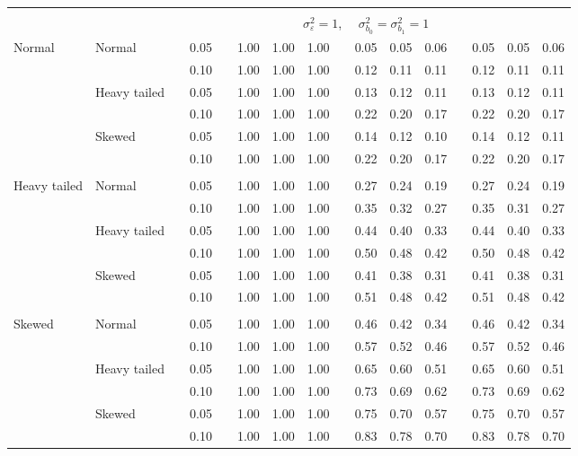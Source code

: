 \begin{table}[ht]
\begin{scriptsize}
\begin{tabular}{ll p{.1cm} c p{.1cm} rrr p{.1cm} rrr p{.1cm} rrr}
&&&&&&&&&&&&&&&\\
& && && \multicolumn{9}{c}{$\sigma_{\varepsilon}^2 = 1$, \ \ $\sigma_{b_0}^2 = \sigma_{b_1}^2 = 1$} \\ \cline{6-16}

\rowcolor{gray!20} Normal       & Normal       && 0.05 &&  1.00 & 1.00 & 1.00 && 0.05 & 0.05 & 0.06 && 0.05 & 0.05 & 0.06 \\ 
\rowcolor{gray!20}             &              && 0.10 &&  1.00 & 1.00 & 1.00 && 0.12 & 0.11 & 0.11 && 0.12 & 0.11 & 0.11 \\ 
\rowcolor{gray!20}             & Heavy tailed && 0.05 &&  1.00 & 1.00 & 1.00 && 0.13 & 0.12 & 0.11 && 0.13 & 0.12 & 0.11 \\ 
\rowcolor{gray!20}             &              && 0.10 &&  1.00 & 1.00 & 1.00 && 0.22 & 0.20 & 0.17 && 0.22 & 0.20 & 0.17 \\ 
\rowcolor{gray!20}             & Skewed       && 0.05 &&  1.00 & 1.00 & 1.00 && 0.14 & 0.12 & 0.10 && 0.14 & 0.12 & 0.11 \\ 
\rowcolor{gray!20}             &              && 0.10 &&  1.00 & 1.00 & 1.00 && 0.22 & 0.20 & 0.17 && 0.22 & 0.20 & 0.17 \\
             &&&&&&&&&&&&&&&\\ 
Heavy tailed & Normal       && 0.05 &&  1.00 & 1.00 & 1.00 && 0.27 & 0.24 & 0.19 && 0.27 & 0.24 & 0.19 \\ 
             &              && 0.10 &&  1.00 & 1.00 & 1.00 && 0.35 & 0.32 & 0.27 && 0.35 & 0.31 & 0.27 \\ 
             & Heavy tailed && 0.05 &&  1.00 & 1.00 & 1.00 && 0.44 & 0.40 & 0.33 && 0.44 & 0.40 & 0.33 \\ 
             &              && 0.10 &&  1.00 & 1.00 & 1.00 && 0.50 & 0.48 & 0.42 && 0.50 & 0.48 & 0.42 \\ 
             & Skewed       && 0.05 &&  1.00 & 1.00 & 1.00 && 0.41 & 0.38 & 0.31 && 0.41 & 0.38 & 0.31 \\ 
             &              && 0.10 &&  1.00 & 1.00 & 1.00 && 0.51 & 0.48 & 0.42 && 0.51 & 0.48 & 0.42 \\ 
             &&&&&&&&&&&&&&&\\
Skewed       & Normal       && 0.05 &&  1.00 & 1.00 & 1.00 && 0.46 & 0.42 & 0.34 && 0.46 & 0.42 & 0.34 \\ 
             &              && 0.10 &&  1.00 & 1.00 & 1.00 && 0.57 & 0.52 & 0.46 && 0.57 & 0.52 & 0.46 \\ 
             & Heavy tailed && 0.05 &&  1.00 & 1.00 & 1.00 && 0.65 & 0.60 & 0.51 && 0.65 & 0.60 & 0.51 \\ 
             &              && 0.10 &&  1.00 & 1.00 & 1.00 && 0.73 & 0.69 & 0.62 && 0.73 & 0.69 & 0.62 \\ 
             & Skewed       && 0.05 &&  1.00 & 1.00 & 1.00 && 0.75 & 0.70 & 0.57 && 0.75 & 0.70 & 0.57 \\ 
             &              && 0.10 &&  1.00 & 1.00 & 1.00 && 0.83 & 0.78 & 0.70 && 0.83 & 0.78 & 0.70 \\ 



\end{tabular}
\end{scriptsize}
\end{table}

